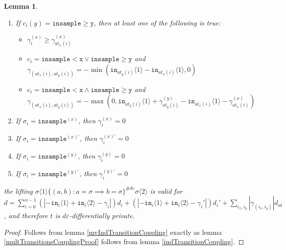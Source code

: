 \documentclass[12pt]{article}
\newcommand{\gguard}[1][x]{\texttt{insample}\geq #1}
\newcommand{\lguard}[1][x]{\texttt{insample} < #1}
\newcommand{\brangle}[1]{\langle #1 \rangle}
\newtheorem{lemma}[thm]{Lemma}
\theoremstyle{definition}
\begin{document}
\begin{lemma}
\begin{enumerate}
\begin{itemize}
            \item $\gamma_i^{(y)}\leq \gamma^{(y)}_{at_y(i)}$
            \item $c_i = \gguard[\texttt{x}]\lor\lguard[\texttt{y}]$ and $\gamma_{(at_x(i), at_y(i))} = -\min(\texttt{in}_{at_x(i)}\brangle{1}-\texttt{in}_{at_y(i)}\brangle{1}, 0)$
            \item $c_i = \gguard[\texttt{x}]\land\lguard[\texttt{y}]$ and $\gamma_{(at_x(i), at_y(i))} = -\max(0, \texttt{in}_{at_x(i)}\brangle{1}+ \gamma_{at_x(i)}^{(x)}-\texttt{in}_{at_y(i)}\brangle{1}-\gamma_{at_y(i)}^{(y)})$
        \end{itemize}
        \item If $c_i(y) = \gguard[\texttt{y}]$, then at least one of the following is true: \begin{itemize}
            \item $\gamma_i^{(x)}\geq \gamma^{(x)}_{at_x(i)}$
            \item $c_i = \lguard[\texttt{x}]\lor\gguard[\texttt{y}]$ and $\gamma_{(at_x(i), at_y(i))} = -\min(\texttt{in}_{at_y(i)}\brangle{1}-\texttt{in}_{at_x(i)}\brangle{1}, 0)$
            \item $c_i = \lguard[\texttt{x}]\land\gguard[\texttt{y}]$ and $\gamma_{(at_x(i), at_y(i))} = -\max(0, \texttt{in}_{at_y(i)}\brangle{1}+ \gamma_{at_y(i)}^{(y)}-\texttt{in}_{at_x(i)}\brangle{1}-\gamma_{at_x(i)}^{(x)})$
        \end{itemize}
        \item If $\sigma_i = \texttt{insample}^{(x)}$, then $\gamma_i^{(x)}=0$
        \item If $\sigma_i = \texttt{insample}^{(x)\prime}$, then $\gamma_i^{(x)\prime}=0$
        \item If $\sigma_i = \texttt{insample}^{(y)}$, then $\gamma_i^{(y)}=0$
        \item If $\sigma_i = \texttt{insample}^{(y)\prime}$, then $\gamma_i^{(y)\prime}=0$
    \end{enumerate}
      the lifting $\sigma\brangle{1}\{(a, b): a=\sigma\implies b=\sigma\}^{\#d\varepsilon}\sigma\brangle{2}$ is valid for $d = \sum_{i=0}^{n-1}(|-\texttt{in}_i\brangle{1}+\texttt{in}_i\brangle{2}-\gamma_i|)d_i+(|-\texttt{in}_i\brangle{1}+\texttt{in}_i\brangle{2}-\gamma_i'|)d_i' + \sum_{i_x, i_y}|\gamma_{(i_x, i_y)}|d_{at}$, and therefore $t$ is $d\varepsilon$-differentially private. 
\end{lemma}
\begin{proof}
    Follows from lemma \ref{mvIndTransitionCoupling} exactly as lemma \ref{multTransitionsCouplingProof} follows from lemma \ref{indTransitionCoupling}.
\end{proof}
\end{document}
